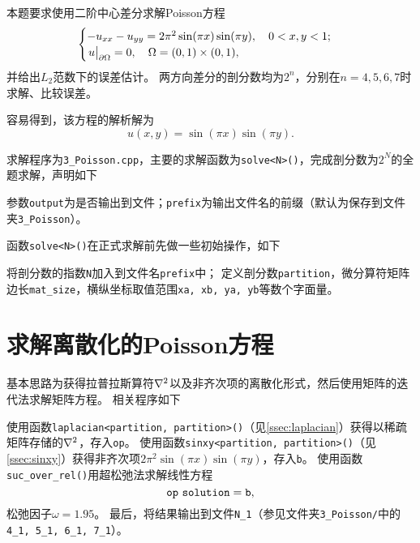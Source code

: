 本题要求使用二阶中心差分求解Poisson方程
\begin{equation}
    \begin{cases}
        -u_{xx} - u_{yy} = 2\pi^2\sin(\pi x)\sin(\pi y),\quad 0<x, y<1;\\
        \eval{u}_{\partial \Omega} = 0, \quad \Omega=(0, 1)\times(0, 1),
    \end{cases}
\end{equation}
并给出$L_2$范数下的误差估计。
两方向差分的剖分数均为$2^n$，分别在$n=4,5,6,7$时求解、比较误差。

容易得到，该方程的解析解为
\begin{equation}
    u(x,y) = \sin(\pi x)\sin(\pi y).
\end{equation}

求解程序为\texttt{3\_Poisson.cpp}，主要的求解函数为\texttt{solve<N>()}，完成剖分数为$2^N$的全题求解，声明如下
{
    \linespread{1.0}
    
}
参数\texttt{output}为是否输出到文件；\texttt{prefix}为输出文件名的前缀（默认为保存到文件夹\texttt{3\_Poisson}）。

函数\texttt{solve<N>()}在正式求解前先做一些初始操作，如下
{
    \linespread{1.0}
    
}
将剖分数的指数\texttt{N}加入到文件名\texttt{prefix}中；
定义剖分数\texttt{partition}，微分算符矩阵边长\texttt{mat\_size}，横纵坐标取值范围\texttt{xa, xb, ya, yb}等数个字面量。

\section{求解离散化的Poisson方程}
基本思路为获得拉普拉斯算符$\laplacian$以及非齐次项的离散化形式，然后使用矩阵的迭代法求解矩阵方程。
相关程序如下
{
    \linespread{1.0}
    
}
使用函数\texttt{laplacian<partition, partition>()}（见\autoref{ssec:laplacian}）获得以稀疏矩阵存储的$\laplacian$，存入\texttt{op}。
使用函数\texttt{sinxy<partition, partition>()}（见\autoref{ssec:sinxy}）获得非齐次项$2\pi^2\sin(\pi x)\sin(\pi y)$，存入\texttt{b}。
使用函数\texttt{suc\_over\_rel()}用超松弛法求解线性方程\begin{equation}
    \text{\texttt{op} \texttt{solution}} = \text{\texttt{b}},
\end{equation}
松弛因子$\omega=1.95$。
最后，将结果输出到文件\texttt{N\_1}（参见文件夹\texttt{3\_Poisson/}中的\texttt{4\_1, 5\_1, 6\_1, 7\_1}）。

